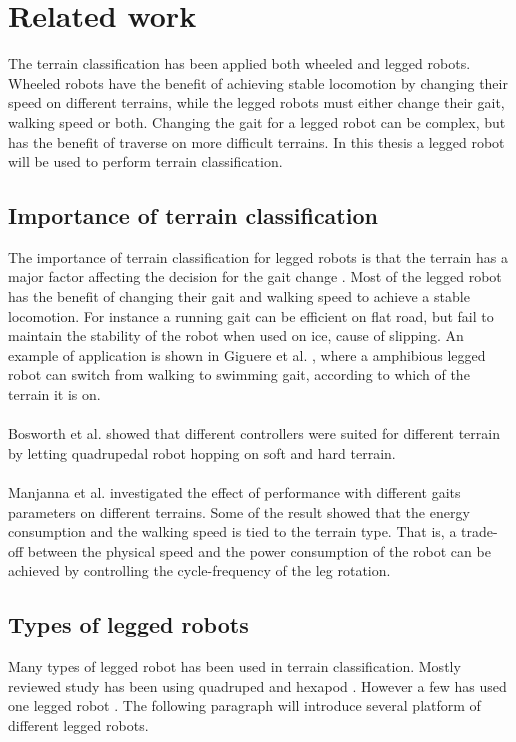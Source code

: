 \documentclass[USenglish]{ifimaster}  %
\begin{document}
\section{Related work}
The terrain classification has been applied both wheeled and legged robots. Wheeled robots have the benefit of achieving stable locomotion by changing their speed on different terrains, while the legged robots must either change their gait, walking speed or both. Changing the gait for a legged robot can be complex, but has the benefit of traverse on more difficult terrains. In this thesis a legged robot will be used to perform terrain classification.

\subsection{Importance of terrain classification}
The importance of terrain classification for legged robots is that the terrain has a major factor affecting the decision for the gait change \cite{6569179}. Most of the legged robot has the benefit of changing their gait and walking speed to achieve a stable locomotion. For instance a running gait can be efficient on flat road, but fail to maintain the stability of the robot when used on ice, cause of slipping. An example of application is shown in Giguere et al. \cite{Giguere06environmentidentification}, where a amphibious legged robot can switch from walking to swimming gait, according to which of the terrain it is on. 
\\
\\
Bosworth et al. \cite{7487541} showed that different controllers were suited for different terrain by letting quadrupedal robot hopping on soft and hard terrain. 
\\
\\
Manjanna et al. \cite{6569179} investigated the effect of performance with different gaits parameters on different terrains. Some of the result showed that the energy consumption and the walking speed is tied to the terrain type. That is, a trade-off between the physical speed and the power consumption of the robot can be achieved by controlling the cycle-frequency of the leg rotation.


\subsection{Types of legged robots}
Many types of legged robot has been used in terrain classification. Mostly reviewed study has been using quadruped \cite{6784609,littleDog,6849778,Hoffmann20141790} and hexapod \cite{Walas2015,26b23e912c654fe4b7478fd910130195,6569179}. However a few has used one legged robot \cite{5602459}. The following paragraph will introduce several platform of different legged robots.
\end{document}
